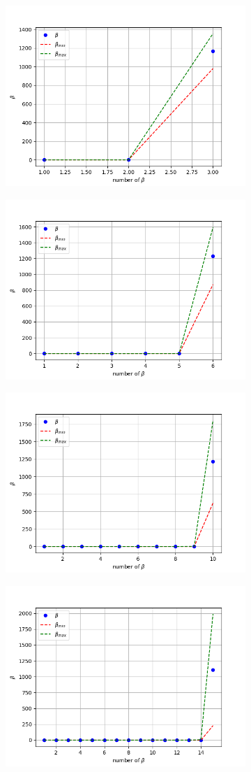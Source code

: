 \begin{figure}[!ht]
\begin{subfigure}{\textwidth}
  \centering
  \includegraphics[width=0.5\linewidth]{images/real/real_ridge_beta_p01_nreal.png}
\end{subfigure}
\begin{subfigure}{\textwidth}
  \centering
\includegraphics[width=0.5\linewidth]{images/real/real_ridge_beta_p02_nreal.png}
\end{subfigure}
\begin{subfigure}{\textwidth}
  \centering
\includegraphics[width=0.5\linewidth]{images/real/real_ridge_beta_p03_nreal.png}
\end{subfigure}
\begin{subfigure}{\textwidth}
  \centering
\includegraphics[width=0.5\linewidth]{images/real/real_ridge_beta_p04_nreal.png}

\end{subfigure}
\end{figure}
